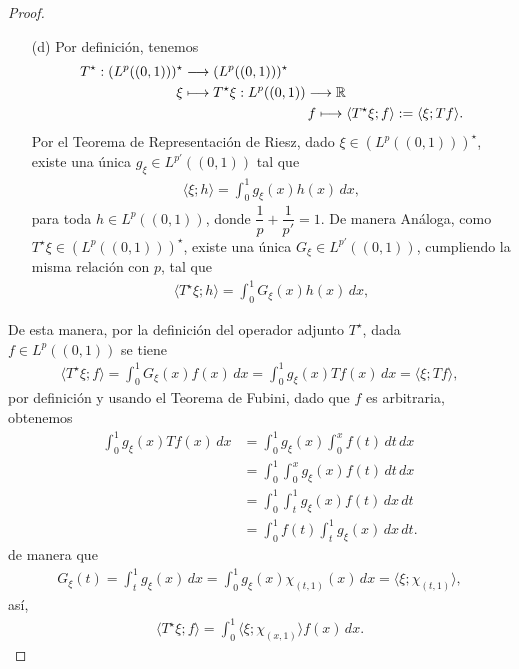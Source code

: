 \begin{proof}
\begin{enumerate}
        \item[(d)] Por definición, tenemos
        \begin{align*}
            T^\star: (L^p((0,1)))^\star &\longrightarrow (L^p((0,1)))^\star\\
            \xi &\longmapsto T^\star\xi: L^p((0,1)) \longrightarrow \mathbb{R}\\
            & \hspace{31.5mm} f \longmapsto \langle T^\star\xi; f\rangle:=\langle \xi;Tf\rangle. 
        \end{align*}
        Por el Teorema de Representación de Riesz, dado $\xi \in (L^p((0,1)))^\star$, existe una única $g_\xi \in L^{p'}((0,1))$ tal que 
        \begin{align*}
            \langle \xi;h\rangle=\int_0^1 g_\xi(x)h(x)\, dx,
        \end{align*}
        para toda $h \in L^p((0,1))$, donde $\dfrac{1}{p}+\dfrac{1}{p'}=1$. De manera Análoga, como\\ $T^\star \xi \in (L^p((0,1)))^\star$, existe una única $G_\xi\in L^{p'}((0,1))$, cumpliendo la misma relación con $p$, tal que 
        \begin{align*}
            \langle T^\star \xi;h\rangle=\int_0^1 G_\xi(x)h(x)\, dx,
        \end{align*}
    \end{enumerate}
    De esta manera, por la definición del operador adjunto $T^\star$, dada $f \in L^p((0,1))$ se tiene
    \begin{align*}
        \langle T^\star \xi;f\rangle=\int_{0}^1G_\xi(x)f(x)\, dx=\int_0^1 g_\xi(x)Tf(x)\, dx=\langle \xi;Tf\rangle,
    \end{align*}
    por definición y usando el Teorema de Fubini, dado que $f$ es arbitraria, obtenemos
    \begin{align*}
        \int_0^1 g_\xi(x)Tf(x)\, dx&=\int_0^1 g_\xi(x)\int_0^x f(t)\, dt\, dx\\
        &=\int_0^1 \int_0^x g_\xi(x)f(t)\, dt\, dx\\
        &=\int_0^1 \int_t^1 g_\xi(x)f(t)\, dx\, dt\\
        &=\int_0^1f(t)\int_{t}^1g_\xi(x)\, dx\, dt.
    \end{align*}
    de manera que
    \begin{align*}
        G_\xi(t)=\int_t^1 g_\xi(x)\, dx=\int_{0}^1 g_{\xi}(x)\chi_{(t,1)}(x)\, dx=\langle \xi;\chi_{(t,1)}\rangle,
    \end{align*}
    así, 
    \begin{align*}
        \langle T^\star \xi;f\rangle=\int_0^1 \langle \xi;\chi_{(x,1)}\rangle f(x)\, dx.
    \end{align*}
\end{proof}

